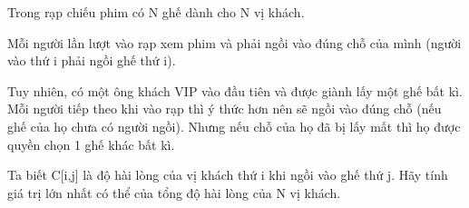 Trong rạp chiếu phim có N ghế dành cho N vị khách.  

   Mỗi người lần lượt vào rạp xem phim và phải ngồi vào đúng chỗ của mình (người vào thứ i phải ngồi ghế thứ i).  

   Tuy nhiên, có một ông khách VIP vào đầu tiên và được giành lấy một ghế bất kì. Mỗi người tiếp theo khi vào rạp thì ý thức hơn nên sẽ ngồi vào đúng chỗ (nếu ghế của họ chưa có người ngồi). Nhưng nếu chỗ của họ đã bị lấy mất thì họ được quyền chọn 1 ghế khác bất kì.  

   Ta biết C[i,j] là độ hài lòng của vị khách thứ i khi ngồi vào ghế thứ j. Hãy tính giá trị lớn nhất có thể của tổng độ hài lòng của N vị khách.